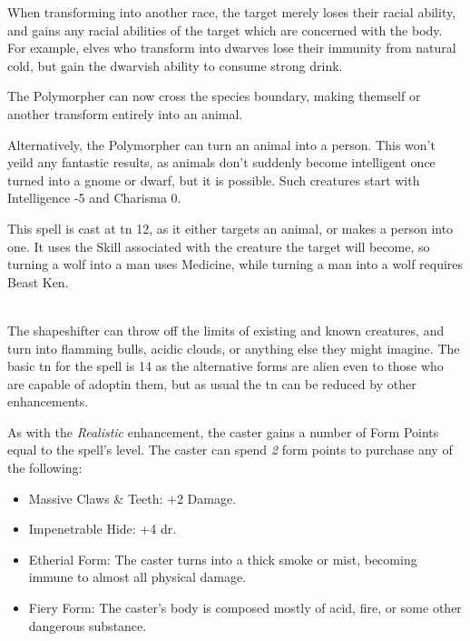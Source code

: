 \begin{multicols}{2}
When transforming into another race, the target merely loses their racial ability, and gains any racial abilities of the target which are concerned with the body.  For example, elves who transform into dwarves lose their immunity from natural cold, but gain the dwarvish ability to consume strong drink.


The Polymorpher can now cross the species boundary, making themself or another transform entirely into an animal.

Alternatively, the Polymorpher can turn an animal into a person.
This won't yeild any fantastic results, as animals don't suddenly become intelligent once turned into a gnome or dwarf, but it is possible.
Such creatures start with Intelligence -5 and Charisma 0.

This spell is cast at \gls{tn} 12, as it either targets an animal, or makes a person into one.  It uses the Skill associated with the creature the target will become, so turning a wolf into a man uses Medicine, while turning a man into a wolf requires Beast Ken.

\spelllevel

\\
The shapeshifter can throw off the limits of existing and known creatures, and turn into flamming bulls, acidic clouds, or anything else they might imagine.  The basic \gls{tn} for the spell is 14 as the alternative forms are alien even to those who are capable of adoptin them, but as usual the \gls{tn} can be reduced by other enhancements.

As with the \textit{Realistic} enhancement, the caster gains a number of Form Points equal to the spell's level.  The caster can spend \textit{2} form points to purchase any of the following:

\begin{itemize}

	\item{Massive Claws \& Teeth: +2 Damage.}
	\item{Impenetrable Hide: +4 \gls{dr}.}
	\item{Etherial Form: The caster turns into a thick smoke or mist, becoming immune to almost all physical damage.}
	\item{Fiery Form: The caster's body is composed mostly of acid, fire, or some other dangerous substance.  }

\end{itemize}

\end{multicols}


